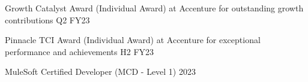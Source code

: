 

\begin{cvhonors}

  \cvhonor
    {Growth Catalyst Award (Individual Award)} %
    {at Accenture for outstanding growth contributions} %
    {} %
    {Q2 FY23} %

  \cvhonor
    {Pinnacle TCI Award (Individual Award)} %
    {at Accenture for exceptional performance and achievements} %
    {} %
    {H2 FY23} %

  \cvhonor
    {MuleSoft Certified Developer (MCD - Level 1)} %
    {} %
    {} %
    {2023} %





\end{cvhonors}

